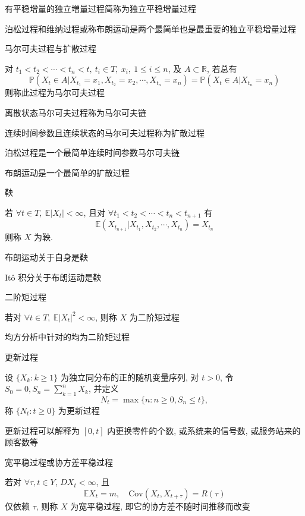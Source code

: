 \documentclass[openany]{ctexbook}
\theoremstyle{kaiti}
\theoremstyle{normal}
\begin{document}
有平稳增量的独立増量过程简称为独立平稳增量过程

泊松过程和维纳过程或称布朗运动是两个最简单也是最重要的独立平稳增量过程

马尔可夫过程与扩散过程

对 $t_1<t_2<\cdots<t_n<t,~t_i\in T,~x_i,~1\leqslant i\leqslant n$, 及 $A\subset\mathbb{R}$, 若总有
\begin{equation}
  \mathbb{P}(X_t\in A|X_{t_1}=x_1,X_{t_2}=x_2,\cdots,X_{t_n}=x_n)=\mathbb{P}(X_t\in A|X_{t_n}=x_n)
\end{equation}
则称此过程为马尔可夫过程

离散状态马尔可夫过程称为马尔可夫链

连续时间参数且连续状态的马尔可夫过程称为扩散过程

泊松过程是一个最简单连续时间参数马尔可夫链

布朗运动是一个最简单的扩散过程

鞅

若 $\forall t\in T,~\mathbb{E}|X_t|<\infty$, 且对 $\forall t_1<t_2<\cdots<t_n<t_{n+1}$ 有
\begin{equation}
  \mathbb{E}(X_{t_{n+1}}|X_{t_1},X_{t_2},\cdots,X_{t_n})=X_{t_n}
\end{equation}
则称 $X$ 为鞅.

布朗运动关于自身是鞅

It\^o 积分关于布朗运动是鞅

二阶矩过程

若对 $\forall t\in T,~\mathbb{E}|X_t|^2<\infty$, 则称 $X$ 为二阶矩过程

均方分析中针对的均为二阶矩过程

更新过程

设 $\{X_k:k\geqslant1\}$ 为独立同分布的正的随机变量序列, 对 $t>0$, 令 $S_0=0, S_n=\sum_{k=1}^nX_k$, 并定义
\begin{equation}
  N_t=\max\{n:n\geqslant0,S_n\leqslant t\},
\end{equation}
称 $\{N_t:t\geqslant0\}$ 为更新过程

更新过程可以解释为 $[0,t]$ 内更换零件的个数, 或系统来的信号数, 或服务站来的顾客数等

宽平稳过程或协方差平稳过程

若对 $\forall\tau,t\in Y$, $DX_t<\infty$, 且
\begin{equation}
  \mathbb{E}X_t=m,\quad\mathrm{Cov}(X_t,X_{t+\tau})=R(\tau)
\end{equation}
仅依赖 $\tau$, 则称 $X$ 为宽平稳过程, 即它的协方差不随时间推移而改变
\end{document}
